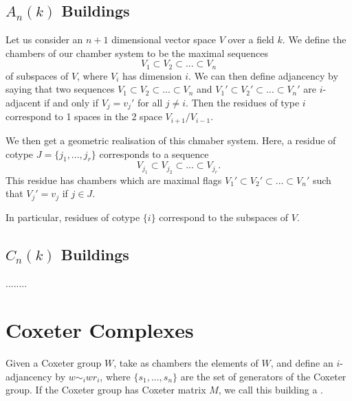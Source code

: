 \documentclass[11pt]{article}
\begin{document}
\subsection{$A_n(k)$ Buildings}

Let us consider an $n+1$ dimensional vector space $V$ over a field $k$. We define the chambers of our chamber system to be the maximal sequences \[V_1\subset V_2\subset ...\subset V_n\] of subspaces of $V$, where $V_i$ has dimension $i$. We can then define adjancency by saying that two sequences $V_1\subset V_2\subset ...\subset V_n$ and $V_1'\subset V_2'\subset ...\subset V_n'$ are $i$-adjacent if and only if $V_j=v_j'$ for all $j\neq i$. Then the residues of type $i$ correspond to 1 spaces in the 2 space $V_{i+1}/V_{i-1}$. 

We then get a geometric realisation of this chmaber system. Here, a residue of cotype $J=\{j_1,...,j_r\}$ corresponds to a sequence \[V_{j_1}\subset V_{j_2}\subset ...\subset V_{j_r}.\] This residue has chambers which are maximal flags $V_1'\subset V_2'\subset ...\subset V_n'$ such that $V_j'=v_j$ if $j\in J$. 

In particular, residues of cotype $\{i\}$ correspond to the subspaces of $V$. 

\subsection{$C_n(k)$ Buildings}

........


\section{Coxeter Complexes}

Given a Coxeter group $W$, take as chambers the elements of $W$, and define an $i$-adjancency by $w\sim_iwr_i$, where $\{s_1,...,s_n\}$ are the set of generators of the Coxeter group. If the Coxeter group has Coxeter matrix $M$, we call this building a .\\
\end{document}
